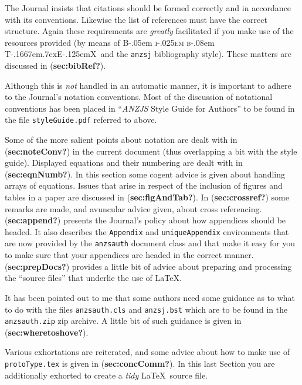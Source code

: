 \documentclass[
  times,
  doublespace]{anzsauth}
\newcommand\BibTeX{{\rmfamily B\kern-.05em \textsc{i\kern-.025em b}\kern-.08em
T\kern-.1667em\lower.7ex\hbox{E}\kern-.125emX}}
\begin{document}
The Journal insists that citations should be formed correctly and in
accordance with its conventions. Likewise the list of references must
have the correct structure. Again these requirements are \emph{greatly}
facilitated if you make use of the resources provided (by means of
\BibTeX~and the \texttt{anzsj} bibliography style). These matters are
discussed in (\textbf{sec:bibRef?}).

Although this is \emph{not} handled in an automatic manner, it is
important to adhere to the Journal's notation conventions. Most of the
discussion of notational conventions has been placed in ``\emph{ANZJS}
Style Guide for Authors'' to be found in the file
\texttt{styleGuide.pdf} referred to above.

Some of the more salient points about notation are dealt with in
(\textbf{sec:noteConv?}) in the current document (thus overlapping a bit
with the style guide). Displayed equations and their numbering are dealt
with in (\textbf{sec:eqnNumb?}). In this section some cogent advice is
given about handling arrays of equations. Issues that arise in respect
of the inclusion of figures and tables in a paper are discussed in
(\textbf{sec:figAndTab?}). In (\textbf{sec:crossref?}) some remarks are
made, and avuncular advice given, about cross referencing.
(\textbf{sec:append?}) presents the Journal's policy about how
appendices should be headed. It also describes the \texttt{Appendix} and
\texttt{uniqueAppendix} environments that are now provided by the
\texttt{anzsauth} document class and that make it easy for you to make
sure that your appendices are headed in the correct manner.
(\textbf{sec:prepDocs?}) provides a little bit of advice about preparing
and processing the ``source files'' that underlie the use of \LaTeX.

It has been pointed out to me that some authors need some guidance as to
what to do with the files \texttt{anzsauth.cls} and \texttt{anzsj.bst}
which are to be found in the \texttt{anzsauth.zip} zip archive. A little
bit of such guidance is given in (\textbf{sec:wheretoshove?}).

Various exhortations are reiterated, and some advice about how to make
use of \texttt{protoType.tex} is given in (\textbf{sec:concComm?}). In
this last Section you are additionally exhorted to create a \emph{tidy}
\LaTeX~source file.
\end{document}
